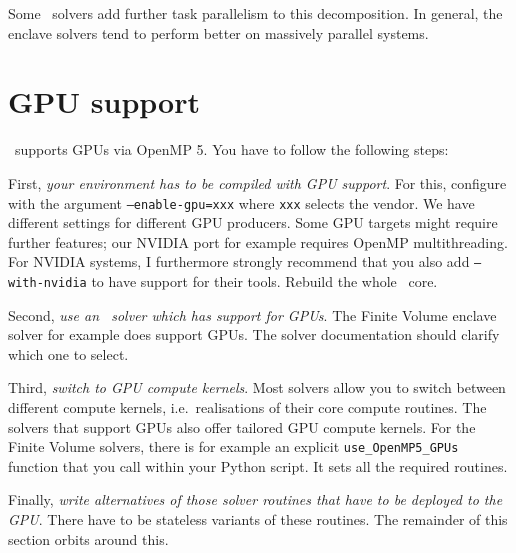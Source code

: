 Some \ExaHyPE\ solvers add further task parallelism to this decomposition. 
In general, the enclave solvers tend to perform better on massively parallel
systems.


% 


\section{GPU support}

\ExaHyPE\ supports GPUs via OpenMP 5.
You have to follow the following steps:


First, \emph{your environment has to be compiled with GPU support}.
For this, configure with the argument \texttt{--enable-gpu=xxx} where
\texttt{xxx} selects the vendor.
We have different settings for different GPU producers.
Some GPU targets might require further features; our NVIDIA port for example
requires OpenMP multithreading.
For NVIDIA systems, I furthermore strongly
recommend that you also add \texttt{--with-nvidia} to have support for their tools.
Rebuild the whole \Peano\ core.


Second, \emph{use an \ExaHyPE\ solver which has support for GPUs}. 
The Finite Volume enclave solver for example does support GPUs. 
The solver documentation should clarify which one to select.


Third, \emph{switch to GPU compute kernels}.
Most solvers allow you to switch between different compute kernels,
i.e.~realisations of their core compute routines.
The solvers that support GPUs also offer tailored GPU compute kernels.
For the Finite Volume solvers, there is for example an explicit
\texttt{use\_OpenMP5\_GPUs} function that you call within your Python
script.
It sets all the required routines.



Finally, \emph{write alternatives of those solver routines that have to be
deployed to the GPU}.
There have to be stateless variants of these routines.
The remainder of this section orbits around this.


